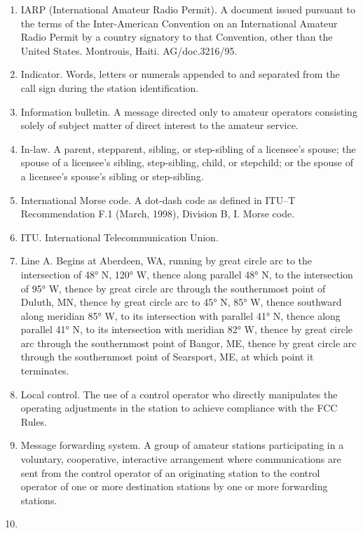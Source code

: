 \documentclass[
  letterpaper,
  DIV=11,
  numbers=noendperiod]{scrreport}
\begin{document}
\begin{enumerate}
\item
  IARP (International Amateur Radio Permit). A document issued pursuant
  to the terms of the Inter-American Convention on an International
  Amateur Radio Permit by a country signatory to that Convention, other
  than the United States. Montrouis, Haiti. AG/doc.3216/95.
\item
  Indicator. Words, letters or numerals appended to and separated from
  the call sign during the station identification.
\item
  Information bulletin. A message directed only to amateur operators
  consisting solely of subject matter of direct interest to the amateur
  service.
\item
  In-law. A parent, stepparent, sibling, or step-sibling of a licensee's
  spouse; the spouse of a licensee's sibling, step-sibling, child, or
  stepchild; or the spouse of a licensee's spouse's sibling or
  step-sibling.
\item
  International Morse code. A dot-dash code as defined in ITU--T
  Recommendation F.1 (March, 1998), Division B, I. Morse code.
\item
  ITU. International Telecommunication Union.
\item
  \leavevmode{}%
  Line A. Begins at Aberdeen, WA, running by great circle arc to the
  intersection of 48° N, 120° W, thence along parallel 48° N, to the
  intersection of 95° W, thence by great circle arc through the
  southernmost point of Duluth, MN, thence by great circle arc to 45° N,
  85° W, thence southward along meridian 85° W, to its intersection with
  parallel 41° N, thence along parallel 41° N, to its intersection with
  meridian 82° W, thence by great circle arc through the southernmost
  point of Bangor, ME, thence by great circle arc through the
  southernmost point of Searsport, ME, at which point it terminates.
\item
  \leavevmode{}%
  Local control. The use of a control operator who directly manipulates
  the operating adjustments in the station to achieve compliance with
  the FCC Rules.
\item
  Message forwarding system. A group of amateur stations participating
  in a voluntary, cooperative, interactive arrangement where
  communications are sent from the control operator of an originating
  station to the control operator of one or more destination stations by
  one or more forwarding stations.
\item

\end{enumerate}
\end{document}
